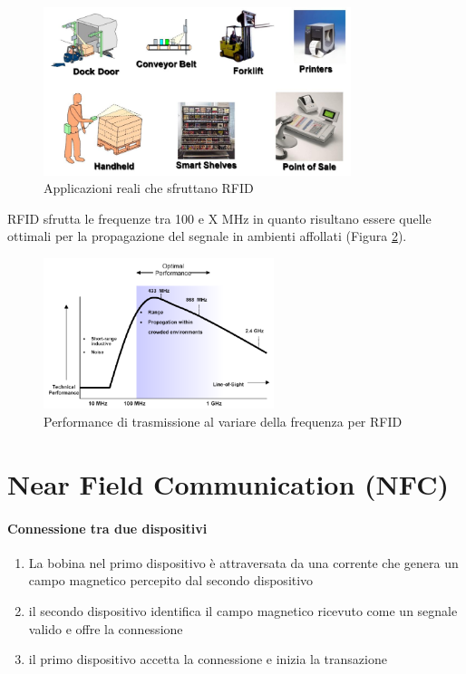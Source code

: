 	\begin{figure}[h]
		\centering
		\includegraphics[width=0.8\textwidth]{lez7/useCasesRFID.png}
		\caption{Applicazioni reali che sfruttano RFID}
		\label{fig:useCasesRFID}
	\end{figure}

	RFID sfrutta le frequenze tra 100 e X MHz in quanto risultano essere quelle ottimali per la propagazione del segnale in ambienti affollati (Figura \ref{fig:frequenzaOttimale}).
	
	\begin{figure}[h]
		\centering
		\includegraphics[width=0.6\textwidth]{lez7/optimalFrequency.png}
		\caption{Performance di trasmissione al variare della frequenza per RFID}
		\label{fig:frequenzaOttimale}
	\end{figure}


\section{Near Field Communication (NFC)}

	\paragraph{Connessione tra due dispositivi}
	\begin{enumerate}
		\item La bobina nel primo dispositivo è attraversata da una corrente che genera un campo magnetico percepito dal secondo dispositivo
		\item il secondo dispositivo identifica il campo magnetico ricevuto come un segnale valido e offre la connessione
		\item il primo dispositivo accetta la connessione e inizia la transazione
	\end{enumerate}

